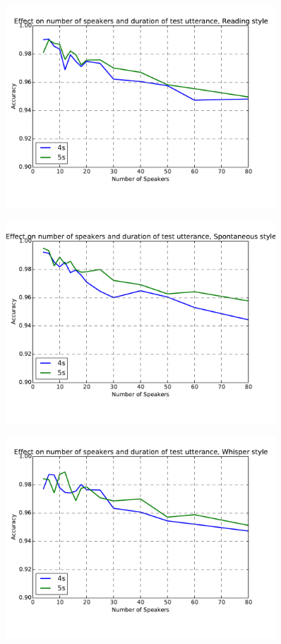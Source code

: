 \begin{figure}[H]
  \centering
  \includegraphics[width=0.9\textwidth]{img/reading.pdf}
\end{figure}
\begin{figure}[H]
  \centering
  \includegraphics[width=0.9\textwidth]{img/spont.pdf}
\end{figure}

\begin{figure}[H]
  \centering
  \includegraphics[width=0.9\textwidth]{img/whisper.pdf}
\end{figure}

